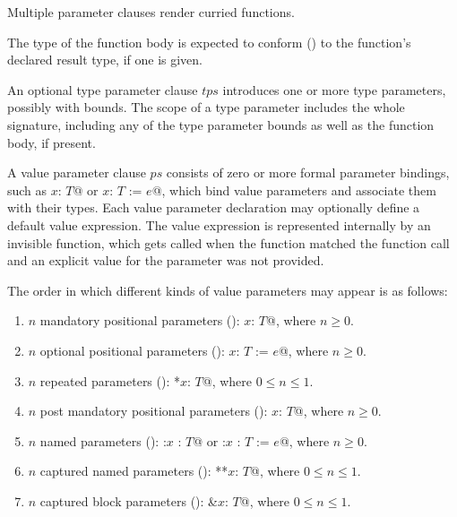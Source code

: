 Multiple parameter clauses render curried functions. 

The type of the function body is expected to conform () to the function's declared result type, if one is given. 

An optional type parameter clause $tps$ introduces one or more type parameters, possibly with bounds. The scope of a type parameter includes the whole signature, including any of the type parameter bounds as well as the function body, if present. 

A value parameter clause $ps$ consists of zero or more formal parameter bindings, such as \lstinline@$x$: $T$@ or \lstinline@$x$: $T$ := $e$@, which bind value parameters and associate them with their types. Each value parameter declaration may optionally define a default value expression. The value expression is represented internally by an invisible function, which gets called when the function matched the function call and an explicit value for the parameter was not provided.

The order in which different kinds of value parameters may appear is as follows:
\begin{enumerate}
\item $n$ mandatory positional parameters (): \lstinline@$x$: $T$@, where $n \ge 0$.

\item $n$ optional positional parameters (): \lstinline@$x$: $T$ := $e$@, where $n \ge 0$. 

\item $n$ repeated parameters (): \lstinline@*$x$: $T$@, where $0 \le n \le 1$. 

\item $n$ post mandatory positional parameters (): \lstinline@$x$: $T$@, where $n \ge 0$.

\item $n$ named parameters (): \lstinline@:$x$ : $T$@ or \lstinline@:$x$ : $T$ := $e$@, where $n \ge 0$. 

\item $n$ captured named parameters (): \lstinline@**$x$: $T$@, where $0 \le n \le 1$. 

\item $n$ captured block parameters (): \lstinline@&$x$: $T$@, where $0 \le n \le 1$.
\end{enumerate}

